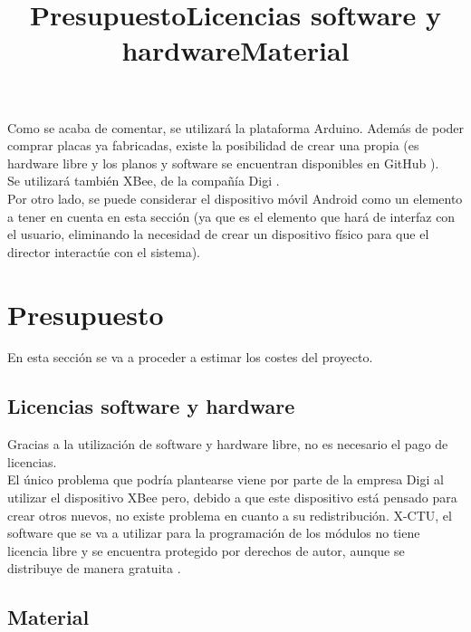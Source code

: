 Como se acaba de comentar, se utilizará la plataforma Arduino. Además de poder comprar
placas ya fabricadas, existe la posibilidad de crear una propia (es hardware libre y
los planos y software se encuentran disponibles en GitHub \cite{arduinoRepo}).\\

Se utilizará también XBee, de la compañía Digi \cite{xbeedatasheet}.\\

Por otro lado, se puede considerar el dispositivo móvil Android como un elemento a
tener en cuenta en esta sección (ya que es el elemento que hará de interfaz con el usuario,
eliminando la necesidad de crear un dispositivo físico para que el director interactúe con
el sistema).\\


\section{Presupuesto}
\title{Presupuesto}

En esta sección se va a proceder a estimar los costes del proyecto.\\

\subsection{Licencias software y hardware}
\title{Licencias software y hardware}

Gracias a la utilización de software y hardware libre, no es necesario el pago de licencias.\\

El único problema que podría plantearse viene por parte de la empresa Digi al utilizar
el dispositivo XBee pero, debido a que este dispositivo está pensado para crear otros
nuevos, no existe problema en cuanto a su redistribución. X-CTU, el software que se va a
utilizar para la programación de los módulos no tiene licencia libre y se encuentra protegido
por derechos de autor, aunque se distribuye de manera gratuita \cite{licenciaXCTU}.\\


\subsection{Material}
\title{Material}

